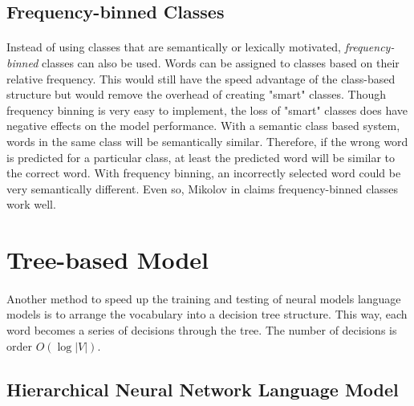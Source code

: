 \subsection{Frequency-binned Classes} \label{sec:frequencybinning}
\paragraph{}
Instead of using classes that are semantically or lexically motivated, \emph{frequency-binned} classes can also be used. Words can be assigned to classes based on their relative frequency. This would still have the speed advantage of the class-based structure but would remove the overhead of creating "smart" classes. Though frequency binning is very easy to implement, the loss of "smart" classes does have negative effects on the model performance. With a semantic class based system, words in the same class will be semantically similar. Therefore, if the wrong word is predicted for a particular class, at least the predicted word will be similar to the correct word. With frequency binning, an incorrectly selected word could be very semantically different. Even so, Mikolov in \cite{Mikolov2012} claims frequency-binned classes work well. 

\section{Tree-based Model}
\paragraph{}
Another method to speed up the training and testing of neural models language models is to arrange the vocabulary into a decision tree structure. This way, each word becomes a series of decisions through the tree. The number of decisions is order $O(\log|V|)$.

\subsection{Hierarchical Neural Network Language Model}
